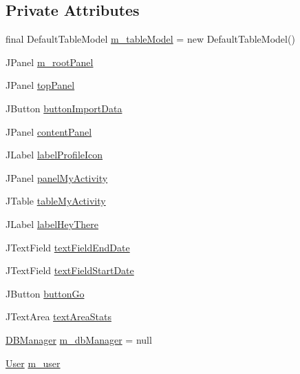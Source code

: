 \subsection*{Private Attributes}
\begin{DoxyCompactItemize}
\item 
final Default\+Table\+Model \mbox{\hyperlink{classcom_1_1activitytracker_1_1_main_window_a5e90682f487d5bb840e3afada9e7ff9a}{m\+\_\+table\+Model}} = new Default\+Table\+Model()
\item 
J\+Panel \mbox{\hyperlink{classcom_1_1activitytracker_1_1_main_window_ac3d61c032aef87f12b1ae6f7dbf482c3}{m\+\_\+root\+Panel}}
\item 
J\+Panel \mbox{\hyperlink{classcom_1_1activitytracker_1_1_main_window_a6baf76b2b8ede1ba82fc6d096ddb580b}{top\+Panel}}
\item 
J\+Button \mbox{\hyperlink{classcom_1_1activitytracker_1_1_main_window_a2e469a48de58cf91979d95148972379b}{button\+Import\+Data}}
\item 
J\+Panel \mbox{\hyperlink{classcom_1_1activitytracker_1_1_main_window_aaa5ce3b10bff65231c65a3d4b33724b0}{content\+Panel}}
\item 
J\+Label \mbox{\hyperlink{classcom_1_1activitytracker_1_1_main_window_a05a555ba49d30b00573d07e5acd39e0a}{label\+Profile\+Icon}}
\item 
J\+Panel \mbox{\hyperlink{classcom_1_1activitytracker_1_1_main_window_a89833c824727a496f4a889177d4d3f3c}{panel\+My\+Activity}}
\item 
J\+Table \mbox{\hyperlink{classcom_1_1activitytracker_1_1_main_window_a0ad6d3ca1298275eba15a9ea189d4d9b}{table\+My\+Activity}}
\item 
J\+Label \mbox{\hyperlink{classcom_1_1activitytracker_1_1_main_window_ac43562736a60a2df2520fbe07e83bc54}{label\+Hey\+There}}
\item 
J\+Text\+Field \mbox{\hyperlink{classcom_1_1activitytracker_1_1_main_window_ab3ce75740bdeca26fec4325f1d5260e1}{text\+Field\+End\+Date}}
\item 
J\+Text\+Field \mbox{\hyperlink{classcom_1_1activitytracker_1_1_main_window_a57257f1403dc59df568de3ac51cdb90a}{text\+Field\+Start\+Date}}
\item 
J\+Button \mbox{\hyperlink{classcom_1_1activitytracker_1_1_main_window_ad25fa99a0108ee160ede6865ecf3b6f0}{button\+Go}}
\item 
J\+Text\+Area \mbox{\hyperlink{classcom_1_1activitytracker_1_1_main_window_ac8e2aa82f079b11dbdc5bcf2e81d2324}{text\+Area\+Stats}}
\item 
\mbox{\hyperlink{classcom_1_1activitytracker_1_1_d_b_manager}{D\+B\+Manager}} \mbox{\hyperlink{classcom_1_1activitytracker_1_1_main_window_ab2af51cb35794567e55564a4d3abbb79}{m\+\_\+db\+Manager}} = null
\item 
\mbox{\hyperlink{classcom_1_1activitytracker_1_1_user}{User}} \mbox{\hyperlink{classcom_1_1activitytracker_1_1_main_window_a96e28fa47e1740a7ddc16aa48406db85}{m\+\_\+user}}
\end{DoxyCompactItemize}


